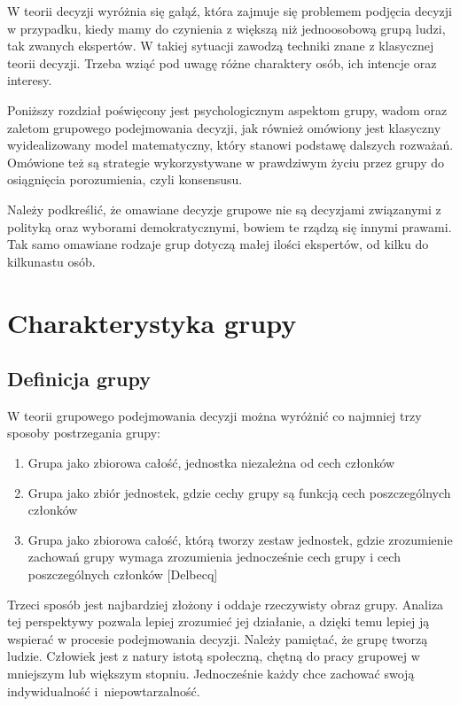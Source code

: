 W teorii decyzji wyróżnia się gałąź, która zajmuje się problemem podjęcia decyzji 
w przypadku, kiedy mamy do czynienia z większą niż jednoosobową grupą ludzi, tak 
zwanych ekspertów. W takiej sytuacji zawodzą techniki znane  z klasycznej 
teorii decyzji. Trzeba wziąć pod uwagę różne charaktery osób, ich intencje oraz
interesy.

Poniższy rozdział poświęcony jest psychologicznym aspektom grupy, wadom oraz 
zaletom grupowego podejmowania decyzji, jak również omówiony jest klasyczny
wyidealizowany model matematyczny, który stanowi podstawę dalszych rozważań.
Omówione też są strategie wykorzystywane w prawdziwym życiu przez grupy do
osiągnięcia porozumienia, czyli konsensusu.

Należy podkreślić, że omawiane decyzje grupowe nie są decyzjami związanymi z
polityką oraz wyborami demokratycznymi, bowiem te rządzą się innymi prawami. Tak
samo omawiane rodzaje grup dotyczą małej ilości ekspertów, od kilku do
kilkunastu osób.
\section{Charakterystyka grupy}

\subsection{Definicja grupy}
W teorii grupowego podejmowania decyzji można wyróżnić co najmniej trzy sposoby 
postrzegania grupy:
\begin{enumerate}

\item Grupa jako zbiorowa całość, jednostka niezależna od cech członków

\item Grupa jako zbiór jednostek, gdzie cechy grupy są funkcją cech poszczególnych członków

\item Grupa jako zbiorowa całość, którą tworzy zestaw jednostek, gdzie zrozumienie 
zachowań grupy wymaga zrozumienia jednocześnie cech grupy i cech poszczególnych
członków [Delbecq]

\end{enumerate}
Trzeci sposób jest najbardziej złożony i oddaje rzeczywisty obraz grupy. Analiza tej 
perspektywy pozwala lepiej zrozumieć jej działanie, a dzięki temu lepiej ją wspierać 
w procesie podejmowania decyzji. Należy pamiętać, że grupę tworzą ludzie. Człowiek jest 
z natury istotą społeczną, chętną do pracy grupowej w mniejszym lub większym stopniu. 
Jednocześnie każdy chce zachować swoją indywidualność i niepowtarzalność. 

